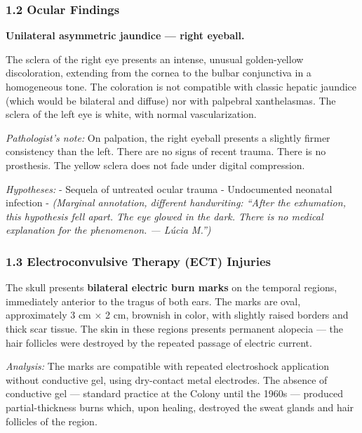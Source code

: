 \subsubsection*{1.2 Ocular Findings}

\noindent \textbf{Unilateral asymmetric jaundice --- right eyeball.}

\noindent The sclera of the right eye presents an intense, unusual golden-yellow discoloration, extending from the cornea to the bulbar conjunctiva in a homogeneous tone. The coloration is not compatible with classic hepatic jaundice (which would be bilateral and diffuse) nor with palpebral xanthelasmas. The sclera of the left eye is white, with normal vascularization.

\noindent \textit{Pathologist's note:} On palpation, the right eyeball presents a slightly firmer consistency than the left. There are no signs of recent trauma. There is no prosthesis. The yellow sclera does not fade under digital compression.

\noindent \textit{Hypotheses:}
- Sequela of untreated ocular trauma
- Undocumented neonatal infection
- \textit{(Marginal annotation, different handwriting: ``After the exhumation, this hypothesis fell apart. The eye glowed in the dark. There is no medical explanation for the phenomenon. --- Lúcia M.'')}

\subsubsection*{1.3 Electroconvulsive Therapy (ECT) Injuries}

\noindent The skull presents \textbf{bilateral electric burn marks} on the temporal regions, immediately anterior to the tragus of both ears. The marks are oval, approximately 3 cm × 2 cm, brownish in color, with slightly raised borders and thick scar tissue. The skin in these regions presents permanent alopecia --- the hair follicles were destroyed by the repeated passage of electric current.

\noindent \textit{Analysis:} The marks are compatible with repeated electroshock application without conductive gel, using dry-contact metal electrodes. The absence of conductive gel --- standard practice at the Colony until the 1960s --- produced partial-thickness burns which, upon healing, destroyed the sweat glands and hair follicles of the region.

